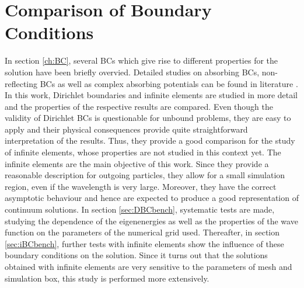 \section{Comparison of Boundary Conditions}
\label{ch:BCbench}
In section \ref{ch:BC}, several BCs which give rise to different properties for the solution have been briefly overvied.
Detailed studies on absorbing BCs, non-reflecting BCs as well as complex absorbing potentials can be found in literature \cite{babuska,artBC,capComp,absRev,nrBCrev}.
In this work, Dirichlet boundaries and infinite elements are studied in more detail and the properties of the respective results are compared.
Even though the validity of Dirichlet BCs is questionable for unbound problems, they are easy to apply and their physical consequences provide quite straightforward interpretation of the results.
Thus, they provide a good comparison for the study of infinite elements, whose properties are not studied in this context yet.
The infinite elements are the main objective of this work.
Since they provide a reasonable description for outgoing particles, they allow for a small simulation region, even if the wavelength is very large.
Moreover, they have the correct asymptotic behaviour and hence are expected to produce a good representation of continuum solutions.
In section \ref{sec:DBCbench}, systematic tests are made, studying the dependence of the eigenenergies as well as the properties of the wave function on the parameters of the numerical grid used.
Thereafter, in section \ref{sec:iBCbench}, further tests with infinite elements show the influence of these boundary conditions on the solution.
Since it turns out that the solutions obtained with infinite elements are very sensitive to the parameters of mesh and simulation box, this study is performed more extensively.


